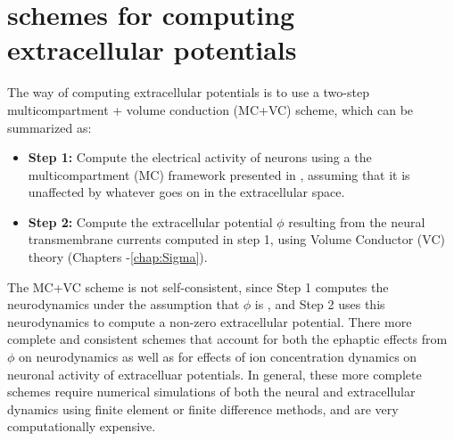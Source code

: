 \chapter{ schemes for computing extracellular potentials}
\label{sec:LFPy}


The  way of computing extracellular potentials is to use a two-step multicompartment + volume conduction (MC+VC) scheme,
which can be summarized as:

\begin{itemize}
\item {\bf Step 1:} Compute the electrical activity of neurons using a the multicompartment (MC) framework presented in , assuming that it is unaffected by whatever goes on in the extracellular space.
\item {\bf Step 2:} Compute the extracellular potential $\phi$ resulting from the neural transmembrane currents computed in step 1, using Volume Conductor (VC) theory (Chapters -\ref{chap:Sigma}).
\end{itemize}

The MC+VC scheme is not self-consistent, since Step 1 computes the neurodynamics under the assumption that $\phi$ is ,
and Step 2 uses this neurodynamics to compute a non-zero extracellular potential.
There  more complete and consistent schemes that account for both the ephaptic effects from $\phi$ on neurodynamics as well as for effects of ion concentration dynamics on neuronal activity of extracelluar potentials. In general, these more complete schemes require numerical simulations of both the neural and extracellular dynamics using finite element or finite difference methods, and are very computationally expensive.

